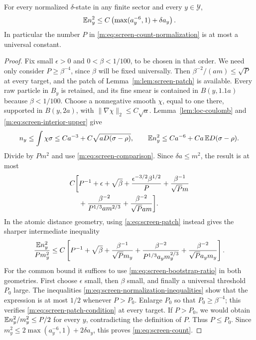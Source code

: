 \begin{lemma}\label{m:lem:screen-count}
For every normalized $\delta$-state in any finite sector and every
$y\in\mathcal Y$,
\begin{equation}\label{m:eq:screen-count}
 \mathbb E n_y^2\le C\left(\max(a_y^{-6},1)+\delta a_y\right).
\end{equation}
In particular the number $P$ in
\eqref{m:eq:screen-count-normalization} is at most a universal constant.
\end{lemma}

\begin{proof}
Fix small $\epsilon>0$ and $0<\beta<1/100$, to be chosen in that
order.  We need only consider $P\ge\beta^{-4}$, since $\beta$ will
be fixed universally.  Then $\beta^{-2}/(am)\le\sqrt P$ at every
target, and the patch of Lemma~\ref{m:lem:screen-patch} is available.
Every raw particle in $B_y$ is retained, and its fine smear is
contained in $B(y,1.1a)$ because $\beta<1/100$.
Choose a nonnegative smooth $\chi$, equal to one there, supported
in $B(y,2a)$, with $\|\nabla\chi\|_2\le C\sqrt a$.
Lemma~\ref{lem:loc-coulomb} and
\eqref{m:eq:screen-interior-upper} give
\[
 n_y\le\int\chi\sigma
 \le Ca^{-3}+C\sqrt{aD(\sigma-\rho)},\qquad
 \mathbb E n_y^2\le Ca^{-6}+Ca\,\mathbb E D(\sigma-\rho).
\]
Divide by $Pm^2$ and use \eqref{m:eq:screen-comparison}.  Since
$\delta a\le m^2$, the result is at most
\begin{align}\label{m:eq:screen-bootstrap-ratio}
 C\bigg[&P^{-1}+\epsilon+\sqrt\beta
       +\frac{\epsilon^{-3/2}\beta^{1/2}}P
       +\frac{\beta^{-1}}{\sqrt Pm}\\
       &+\frac{\beta^{-2}}{P^{1/3}am^{2/3}}
       +\frac{\beta^{-2}}{\sqrt Pam}\bigg].\notag
\end{align}
In the atomic distance geometry, using \eqref{a:eq:screen-patch}
instead gives the sharper intermediate inequality
\begin{equation}\label{a:eq:screen-count-bootstrap}
 \frac{\mathbb E n_y^2}{Pm_y^2}
 \le C\left[P^{-1}+\sqrt\beta
 +\frac{\beta^{-1}}{\sqrt Pm_y}
 +\frac{\beta^{-2}}{P^{1/3}a_ym_y^{2/3}}
 +\frac{\beta^{-2}}{\sqrt P a_ym_y}\right].
\end{equation}
For the common bound it suffices to use
\eqref{m:eq:screen-bootstrap-ratio} in both geometries.
First choose $\epsilon$ small, then $\beta$ small, and finally a
universal threshold $P_0$ large.  The inequalities
\eqref{m:eq:screen-normalization-inequalities} show that the expression
is at most $1/2$ whenever $P>P_0$.  Enlarge $P_0$ so that
$P_0\ge\beta^{-4}$; this verifies
\eqref{m:eq:screen-patch-condition} at every target.  If $P>P_0$, we
would obtain $\mathbb E n_y^2/m_y^2\le P/2$ for every $y$, contradicting
the definition of $P$.  Thus $P\le P_0$.  Since
$m_y^2\le2\max(a_y^{-6},1)+2\delta a_y$, this proves
\eqref{m:eq:screen-count}.
\end{proof}

